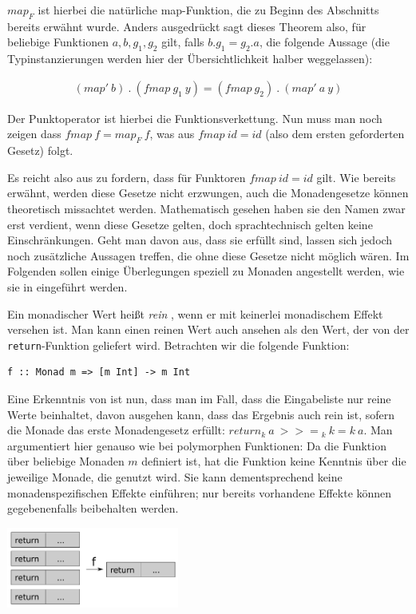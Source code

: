 $map_F$ ist hierbei die natürliche map-Funktion, die zu Beginn des Abschnitts bereits erwähnt wurde. 
Anders ausgedrückt sagt dieses Theorem also, für beliebige Funktionen $a, b, g_1, g_2$ gilt, falls $b . g_1 = g_2 . a$, die folgende Aussage
(die Typinstanzierungen werden hier der Übersichtlichkeit halber weggelassen):

\begin{align*}
(map'\ b)\ .\ (fmap\ g_1\ y) = (fmap\ g_2)\ .\ (map'\ a\ y)
\end{align*}

Der Punktoperator ist hierbei die Funktionsverkettung. Nun muss man noch zeigen dass $fmap\ f = map_F\ f$, was aus $fmap\ id = id$ (also dem ersten geforderten Gesetz) folgt. 

Es reicht also aus zu fordern, dass für Funktoren $fmap\ id = id$ gilt. Wie bereits erwähnt, werden diese Gesetze nicht
erzwungen, auch die Monadengesetze können theoretisch missachtet werden. Mathematisch gesehen haben sie den
Namen zwar erst verdient, wenn diese Gesetze gelten, doch sprachtechnisch gelten keine Einschränkungen.
Geht man davon aus, dass sie erfüllt sind, lassen sich jedoch noch zusätzliche Aussagen treffen, die ohne diese Gesetze
nicht möglich wären. Im Folgenden sollen einige Überlegungen speziell zu Monaden angestellt werden, wie sie in \cite{voigtlander}
eingeführt werden.

Ein monadischer Wert heißt \textit{rein} , wenn er mit keinerlei monadischem Effekt versehen ist. Man
kann einen reinen Wert auch ansehen als den Wert, der von der \texttt{return}-Funktion geliefert wird. Betrachten wir die
folgende Funktion:

\begin{verbatim}
f :: Monad m => [m Int] -> m Int
\end{verbatim}

Eine Erkenntnis von \cite{voigtlander} ist nun, dass man im Fall, dass die Eingabeliste nur reine Werte beinhaltet, davon ausgehen
kann, dass das Ergebnis auch rein ist, sofern die Monade das erste Monadengesetz erfüllt: $return_k\ a\ {>>=}_k\ k = k\ a$. Man argumentiert hier genauso wie bei polymorphen Funktionen: Da die Funktion über
beliebige Monaden $m$ definiert ist, hat die Funktion keine Kenntnis über die jeweilige Monade, die genutzt wird.
Sie kann dementsprechend keine monadenspezifischen Effekte einführen; nur bereits vorhandene
Effekte können gegebenenfalls beibehalten werden.

\includegraphics[height=100px]{purity-preservation}

